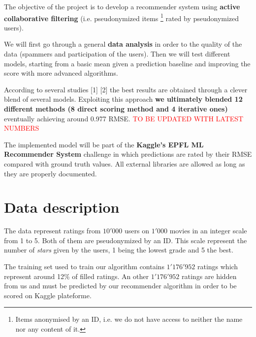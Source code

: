 \documentclass[10pt,conference,compsocconf]{IEEEtran}
\begin{document}
The objective of the project is to develop a recommender system using \textbf{active collaborative filtering} (i.e. pseudonymized items \footnote{Items anonymised by an ID, i.e. we do not have access to neither the name nor any content of it.} rated by pseudonymized users).

We will first go through a general \textbf{data analysis} in order to the quality of the data (spammers and participation of the users). Then we will test different models, starting from a basic mean given a prediction baseline and improving the score with more advanced algorithms.

According to several studies [1] [2] the best results are obtained through a clever blend of several models. Exploiting this approach \textbf{we ultimately blended 12 different methods (8 direct scoring method and 4 iterative ones)} eventually achieving around 0.977 RMSE. \textcolor{red}{TO BE UPDATED WITH LATEST NUMBERS}

The implemented model will be part of the \textbf{Kaggle's EPFL ML Recommender System} challenge in which predictions are rated by their RMSE compared with ground truth values. All external libraries are allowed as long as they are properly documented.

\section{Data description}

The data represent ratings from $10'000$ users on $1'000$ movies in an integer scale from 1 to 5. Both of them are pseudonymized by an ID. This scale represent the number of \textit{stars} given by the users, 1 being the lowest grade and 5 the best.

The training set used to train our algorithm contains $1'176'952$ ratings which represent around 12\% of filled ratings. 
An other $1'176'952$ ratings are hidden from us and must be predicted by our recommender algorithm in order to be scored on Kaggle plateforme.


\end{document}

